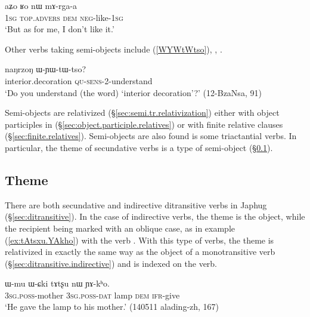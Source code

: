 \begin{exe}
\ex \label{ex:aZo.Ro.nW.mArgaa}
\gll aʑo ʁo nɯ mɤ-rga-a \\
\textsc{1sg}  \textsc{top}.\textsc{advers} \textsc{dem} \textsc{neg}-like-\textsc{1sg} \\
\glt `But as for me, I don't like it.' 
\end{exe}

Other verbs taking semi-objects include  (\ref{WYWtWtso}), , .

\begin{exe}
\ex \label{WYWtWtso}
 \gll naŋrzoŋ ɯ-ɲɯ-tɯ-tso? \\
interior.decoration \textsc{qu}-\textsc{sens}-2-understand \\
\glt `Do you understand (the word) `interior decoration'?' (12-BzaNsa, 91)
\end{exe}

Semi-objects are relativized (§\ref{sec:semi.tr.relativization}) either with object participles in  (§\ref{sec:object.participle.relatives}) or with finite relative clauses (§\ref{sec:finite.relatives}). Semi-objects are also found is some triactantial verbs. In particular, the theme of secundative verbs is a type of semi-object (§\ref{sec:theme.ditransitive}).

\subsection{Theme}  \label{sec:theme.ditransitive}
There are both secundative and indirective ditransitive verbs in Japhug (§\ref{sec:ditransitive}). In the case of indirective verbs, the theme is the object, while the recipient being marked with an oblique case, as in example (\ref{ex:tAtsxu.YAkho}) with the verb  . With this type of verbs, the theme is relativized in exactly the same way as the object of a monotransitive verb (§\ref{sec:ditransitive.indirective}) and is indexed on the verb.

\begin{exe}
\ex \label{ex:tAtsxu.YAkho} 
\gll ɯ-mu ɯ-ɕki tɤtʂu nɯ ɲɤ-kʰo. \\
\textsc{3sg}.\textsc{poss}-mother \textsc{3sg}.\textsc{poss}-\textsc{dat} lamp \textsc{dem}  \textsc{ifr}-give \\
 \glt `He gave the lamp to his mother.' (140511 alading-zh, 167)
\end{exe}


